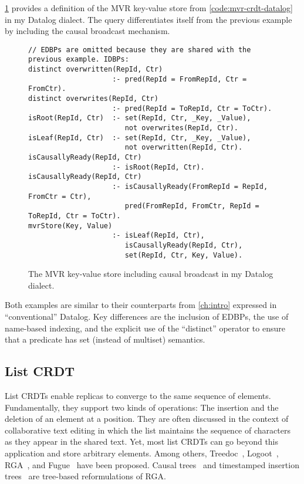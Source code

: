 \ref{code:mvr-crdt-datalog-dialect} provides a definition of the \ac{MVR}
key-value store from \ref{code:mvr-crdt-datalog} in my Datalog dialect.
The query differentiates itself from the previous example by including the
causal broadcast mechanism.

\begin{figure}[htpb]
    \begin{lstlisting}[keepspaces]
// EDBPs are omitted because they are shared with the previous example. IDBPs:
distinct overwritten(RepId, Ctr)
                    :- pred(RepId = FromRepId, Ctr = FromCtr).
distinct overwrites(RepId, Ctr)
                    :- pred(RepId = ToRepId, Ctr = ToCtr).
isRoot(RepId, Ctr)  :- set(RepId, Ctr, _Key, _Value),
                       not overwrites(RepId, Ctr).
isLeaf(RepId, Ctr)  :- set(RepId, Ctr, _Key, _Value),
                       not overwritten(RepId, Ctr).
isCausallyReady(RepId, Ctr)
                    :- isRoot(RepId, Ctr).
isCausallyReady(RepId, Ctr)
                    :- isCausallyReady(FromRepId = RepId, FromCtr = Ctr),
                       pred(FromRepId, FromCtr, RepId = ToRepId, Ctr = ToCtr).
mvrStore(Key, Value)
                    :- isLeaf(RepId, Ctr),
                       isCausallyReady(RepId, Ctr),
                       set(RepId, Ctr, Key, Value).\end{lstlisting}
    \caption{
        The \ac{MVR} key-value store including causal broadcast in my Datalog
        dialect.
    }\label{code:mvr-crdt-datalog-dialect}
\end{figure}

Both examples are similar to their counterparts from \ref{ch:intro}
expressed in ``conventional'' Datalog.
Key differences are the inclusion of \acp{EDBP}, the use of name-based indexing,
and the explicit use of the ``distinct'' operator to ensure that a predicate
has set (instead of multiset) semantics.

\subsection{List \acs{CRDT}}\label{sec:list-crdt-datalog-dialect}

List \acp{CRDT} enable replicas to converge to the same sequence of elements.
Fundamentally, they support two kinds of operations:
The insertion and the deletion of an element at a position.
They are often discussed in the context of collaborative text
editing in which the list maintains the sequence of characters as they appear
in the shared text.
Yet, most list \acp{CRDT} can go beyond this application and store arbitrary
elements.
Among others, Treedoc~\cite{treedoc}, Logoot~\cite{logoot}, \ac{RGA}~\cite{rga},
and Fugue~\cite{fugue} have been proposed.
Causal trees~\cite{causal-trees} and timestamped insertion
trees~\cite{timestamped-insertion-trees} are tree-based reformulations
of \ac{RGA}.

